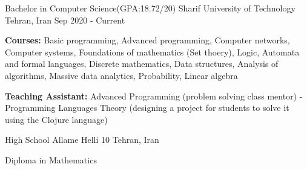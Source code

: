 

\begin{cventries}

  \cventry
  {Bachelor in Computer Science(GPA:18.72/20)} %
  {Sharif University of Technology} %
  {Tehran, Iran} %
  {Sep 2020 - Current} %
  {
    \begin{cvitems} %
      \item {\textbf{Courses:} Basic programming, Advanced programming,
         Computer networks, Computer systems,
           Foundations of mathematics (Set thoery), Logic, Automata and formal languages, Discrete mathematics, Data structures, Analysis of algorithms,  Massive data analytics, Probability, Linear algebra}
      \item {\textbf{Teaching Assistant:} Advanced Programming (problem solving class mentor) - Programming Languages Theory (designing a project for students to solve it using the Clojure language)}
    \end{cvitems}
  }

  \cventry
  {High School} %
  {Allame Helli 10} %
  {Tehran, Iran} %
  {}
  {
    \begin{cvitems} %
    \item {Diploma in Mathematics}
    \end{cvitems}
  }
\end{cventries}
